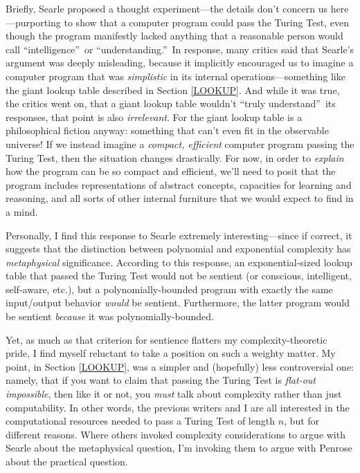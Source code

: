 \documentclass[12pt,onecolumn]{article}%
\begin{document}
Briefly, Searle proposed a thought experiment---the details don't concern us
here---purporting to show that a computer program could pass the Turing Test,
even though the program manifestly lacked anything that a reasonable person
would call \textquotedblleft intelligence\textquotedblright\  or
\textquotedblleft understanding.\textquotedblright\  In response, many
critics said that Searle's argument was deeply misleading, because it
implicitly encouraged us to imagine a computer program that was
\textit{simplistic} in its internal operations---something like the giant
lookup table described in Section \ref{LOOKUP}. And while it was true, the
critics went on, that a giant lookup table wouldn't \textquotedblleft truly
understand\textquotedblright\  its responses, that point is also
\textit{irrelevant}. For the giant lookup table is a philosophical fiction
anyway: something that can't even fit in the observable universe! If we
instead imagine a \textit{compact, efficient} computer program passing the
Turing Test, then the situation changes drastically. For now, in order to
\textit{explain} how the program can be so compact and efficient, we'll need
to posit that the program includes representations of abstract concepts,
capacities for learning and reasoning, and all sorts of other internal
furniture that we would expect to find in a mind.

Personally, I find this response to Searle extremely interesting---since if
correct, it suggests that the distinction between polynomial and exponential
complexity has \textit{metaphysical} significance. According to this
response, an exponential-sized lookup table that passed the Turing Test would
not be sentient (or conscious, intelligent, self-aware, etc.), but a
polynomially-bounded program with exactly the same input/output behavior
\textit{would} be sentient. Furthermore, the latter program would be
sentient \textit{because} it was polynomially-bounded.

Yet, as much as that criterion for sentience flatters my complexity-theoretic
pride, I find myself reluctant to take a position on such a weighty matter.
 My point, in Section \ref{LOOKUP}, was a simpler and (hopefully) less
controversial one: namely, that if you want to claim that passing the Turing
Test is \textit{flat-out impossible}, then like it or not, you \textit{must}
talk about complexity rather than just computability. In other words, the
previous writers \cite{block,parberry,levesque,shieber} and I are all
interested in the computational resources needed to pass a Turing Test of
length $n$, but for different reasons. Where others invoked complexity
considerations to argue with Searle about the metaphysical question, I'm
invoking them to argue with Penrose about the practical question.
\end{document}
